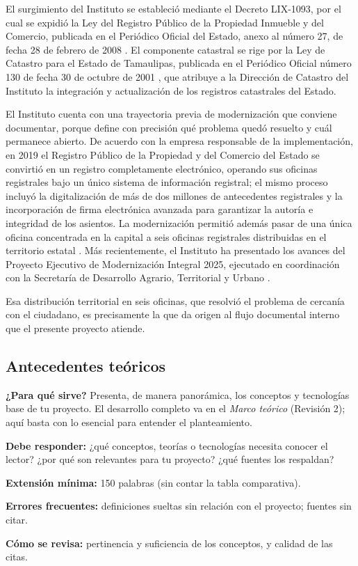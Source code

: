 El surgimiento del Instituto se estableció mediante el Decreto LIX-1093, por el cual se expidió la Ley del Registro Público de la Propiedad Inmueble y del Comercio, publicada en el Periódico Oficial del Estado, anexo al número 27, de fecha 28 de febrero de 2008 \cite{leyrpp2008}. El componente catastral se rige por la Ley de Catastro para el Estado de Tamaulipas, publicada en el Periódico Oficial número 130 de fecha 30 de octubre de 2001 \cite{leycatastro2001}, que atribuye a la Dirección de Catastro del Instituto la integración y actualización de los registros catastrales del Estado.

El Instituto cuenta con una trayectoria previa de modernización que conviene documentar, porque define con precisión qué problema quedó resuelto y cuál permanece abierto. De acuerdo con la empresa responsable de la implementación, en 2019 el Registro Público de la Propiedad y del Comercio del Estado se convirtió en un registro completamente electrónico, operando sus oficinas registrales bajo un único sistema de información registral; el mismo proceso incluyó la digitalización de más de dos millones de antecedentes registrales y la incorporación de firma electrónica avanzada para garantizar la autoría e integridad de los asientos. La modernización permitió además pasar de una única oficina concentrada en la capital a seis oficinas registrales distribuidas en el territorio estatal \cite{futuver2024}. Más recientemente, el Instituto ha presentado los avances del Proyecto Ejecutivo de Modernización Integral 2025, ejecutado en coordinación con la Secretaría de Desarrollo Agrario, Territorial y Urbano \cite{tamaulipas2025mod}.

Esa distribución territorial en seis oficinas, que resolvió el problema de cercanía con el ciudadano, es precisamente la que da origen al flujo documental interno que el presente proyecto atiende.

\subsection{Antecedentes teóricos} \label{sec:antecedentes_teoricos} %

\begin{guia}
\textbf{¿Para qué sirve?} Presenta, de manera panorámica, los conceptos y tecnologías base de tu proyecto. El desarrollo
completo va en el \emph{Marco teórico} (Revisión 2); aquí basta con lo esencial para entender el planteamiento.

\textbf{Debe responder:} ¿qué conceptos, teorías o tecnologías necesita conocer el lector? ¿por qué son relevantes para
tu proyecto? ¿qué fuentes los respaldan?

\textbf{Extensión mínima:} 150 palabras (sin contar la tabla comparativa).

\textbf{Errores frecuentes:} definiciones sueltas sin relación con el proyecto; fuentes sin citar.

\textbf{Cómo se revisa:} pertinencia y suficiencia de los conceptos, y calidad de las citas.
\end{guia}

